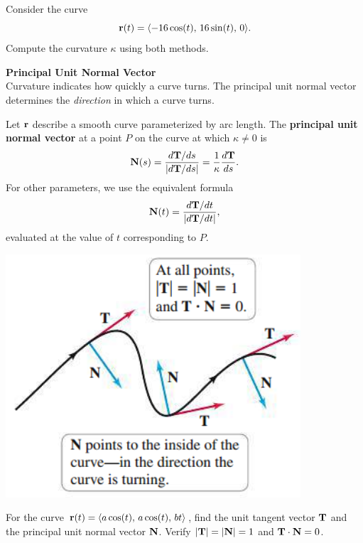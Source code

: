 \documentclass[mathNotesPreamble]{subfiles}
\begin{document}
  \pagebreak

  \begin{ex*}
    Consider the curve
      \[{\mathbf{r}}(t)={\left\langle -16\cos(t),\,16\sin(t),\,0 \right\rangle}.\]
    Compute the curvature $\kappa$ using both methods.
  \end{ex*}

  \pagebreak
  \textbf{Principal Unit Normal Vector}\\
  Curvature indicates how quickly a curve turns. The principal unit normal vector determines the \textit{direction} in which a curve turns.

  \begin{defn*}
    Let ${\mathbf{r}}$ describe a smooth curve parameterized by arc length. The \textbf{principal unit normal vector} at a point $P$ on the curve at which $\kappa\neq 0$ is
      \[{\mathbf{N}}(s)=\frac{d{\mathbf{T}}/ds}{{\left\vert d{\mathbf{T}}/ds\right\vert}}=\frac{1}{\kappa}\frac{d{\mathbf{T}}}{ds}.\]
    For other parameters, we use the equivalent formula
      \[{\mathbf{N}}(t)=\frac{d{\mathbf{T}}/dt}{{\left\vert d{\mathbf{T}}/dt\right\vert}},\]
    evaluated at the value of $t$ corresponding to $P$.
  \end{defn*}
  \begin{center}
    \includegraphics[width=0.275\linewidth]{images/briggs_14_05/fig14_31}
  \end{center}

  \noindent
  \pagebreak

  \begin{ex*}
    For the curve ${\mathbf{r}}(t)={\left\langle a\cos(t),\,a\cos(t),\,bt \right\rangle}$, find the unit tangent vector ${\mathbf{T}}$ and the principal unit normal vector ${\mathbf{N}}$. Verify ${\left\vert{\mathbf{T}}\right\vert}={\left\vert{\mathbf{N}}\right\vert}=1$ and ${\mathbf{T}}\cdot{\mathbf{N}}=0$.
  \end{ex*}
\end{document}
